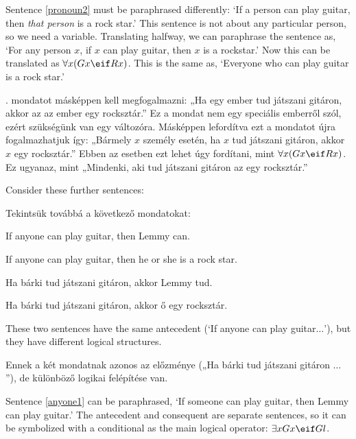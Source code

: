 


Sentence \ref{pronoun2} must be paraphrased differently: `If a person can play guitar, then \emph{that person} is a rock star.' This sentence is not about any particular person, so we need a variable. Translating halfway, we can paraphrase the sentence as, `For any person $x$, if $x$ can play guitar, then $x$ is a rockstar.' Now this can be translated as $\forall x (Gx \eif Rx)$. This is the same as, `Everyone who can play guitar is a rock star.'

. mondatot másképpen kell megfogalmazni: „Ha egy ember tud játszani gitáron, akkor az az ember egy rocksztár.” Ez a mondat nem egy speciális emberről szól, ezért szükségünk van egy változóra. Másképpen lefordítva ezt a mondatot újra fogalmazhatjuk így: „Bármely $x$ személy esetén, ha $x$ tud játszani gitáron, akkor $x$ egy rocksztár.” Ebben az esetben ezt lehet úgy fordítani, mint $\forall x (Gx \eif Rx)$. Ez ugyanaz, mint „Mindenki, aki tud játszani gitáron az egy rocksztár.”


Consider these further sentences:

Tekintsük továbbá a következő mondatokat:


\begin{earg}
\item[\ex{anyone1}] If anyone can play guitar, then Lemmy can.
\item[\ex{anyone2}] If anyone can play guitar, then he or she is a rock star.
\end{earg}

\begin{earg}
\item[\ex{anyone1}] Ha bárki tud játszani gitáron, akkor Lemmy tud.
\item[\ex{anyone2}] Ha bárki tud játszani gitáron, akkor ő egy rocksztár.
\end{earg}

These two sentences have the same antecedent (`If anyone can play guitar$\ldots$'), but they have different logical structures.

Ennek a két mondatnak azonos az előzménye („Ha bárki tud játszani gitáron $\ldots$”), de különböző logikai felépítése van.


Sentence \ref{anyone1} can be paraphrased, `If someone can play guitar, then Lemmy can play guitar.' The antecedent and consequent are separate sentences, so it can be symbolized with a conditional as the main logical operator: $\exists x Gx \eif Gl$.

